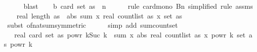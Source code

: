 \begin{isabellebody}
\ \ \ \ \isamarkupfalse%
\ blast\isanewline
\isanewline
\ \ \isamarkupfalse%
\ b{}{\isacharcolon}{\kern0pt}\ {\isachardoublequoteopen}card\ {\isacharparenleft}{\kern0pt}set\ as{\isacharparenright}{\kern0pt}\ {\isasymle}\ n{\isachardoublequoteclose}\isanewline
\ \ \ \ \isamarkupfalse%
\ {\isacharparenleft}{\kern0pt}rule\ card{\isacharunderscore}{\kern0pt}mono{\isacharbrackleft}{\kern0pt}\ B{\isacharequal}{\kern0pt}{\isachardoublequoteopen}{\isacharbraceleft}{\kern0pt}{}{\isachardot}{\kern0pt}{\isachardot}{\kern0pt}{\isacharless}{\kern0pt}n{\isacharbraceright}{\kern0pt}{\isachardoublequoteclose}{\isacharcomma}{\kern0pt}\ simplified{\isacharbrackright}{\kern0pt}{\isacharcomma}{\kern0pt}\ rule\ assms{\isacharparenleft}{\kern0pt}{}{\isacharparenright}{\kern0pt}{\isacharparenright}{\kern0pt}\isanewline
\isanewline
\ \ \isamarkupfalse%
\ {\isachardoublequoteopen}real\ {\isacharparenleft}{\kern0pt}length\ as{\isacharparenright}{\kern0pt}\ {\isacharequal}{\kern0pt}\ abs\ {\isacharparenleft}{\kern0pt}sum\ {\isacharparenleft}{\kern0pt}{\isasymlambda}x{\isachardot}{\kern0pt}\ real\ {\isacharparenleft}{\kern0pt}count{\isacharunderscore}{\kern0pt}list\ as\ x{\isacharparenright}{\kern0pt}{\isacharparenright}{\kern0pt}\ {\isacharparenleft}{\kern0pt}set\ as{\isacharparenright}{\kern0pt}{\isacharparenright}{\kern0pt}{\isachardoublequoteclose}\isanewline
\ \ \ \ \isamarkupfalse%
\ {\isacharparenleft}{\kern0pt}subst\ of{\isacharunderscore}{\kern0pt}nat{\isacharunderscore}{\kern0pt}sum{\isacharbrackleft}{\kern0pt}symmetric{\isacharbrackright}{\kern0pt}{\isacharparenright}{\kern0pt}\isanewline
\ \ \ \ \isamarkupfalse%
\ {\isacharparenleft}{\kern0pt}simp\ add{\isacharcolon}{\kern0pt}\ sum{\isacharunderscore}{\kern0pt}count{\isacharunderscore}{\kern0pt}set{\isacharparenright}{\kern0pt}\isanewline
\ \ \isamarkupfalse%
\ \isamarkupfalse%
\ {\isachardoublequoteopen}{\isachardot}{\kern0pt}{\isachardot}{\kern0pt}{\isachardot}{\kern0pt}\ {\isasymle}\ {\isacharparenleft}{\kern0pt}real\ {\isacharparenleft}{\kern0pt}card\ {\isacharparenleft}{\kern0pt}set\ as{\isacharparenright}{\kern0pt}{\isacharparenright}{\kern0pt}{\isacharparenright}{\kern0pt}\ powr\ {\isacharparenleft}{\kern0pt}{\isacharparenleft}{\kern0pt}k{\isacharminus}{\kern0pt}Suc\ {}{\isacharparenright}{\kern0pt}{\isacharslash}{\kern0pt}k{\isacharparenright}{\kern0pt}\ {\isacharasterisk}{\kern0pt}\ {\isacharparenleft}{\kern0pt}sum\ {\isacharparenleft}{\kern0pt}{\isasymlambda}x{\isachardot}{\kern0pt}\ abs\ {\isacharparenleft}{\kern0pt}real\ {\isacharparenleft}{\kern0pt}count{\isacharunderscore}{\kern0pt}list\ as\ x{\isacharparenright}{\kern0pt}{\isacharparenright}{\kern0pt}\ powr\ k{\isacharparenright}{\kern0pt}\ {\isacharparenleft}{\kern0pt}set\ as{\isacharparenright}{\kern0pt}{\isacharparenright}{\kern0pt}\ powr\ {\isacharparenleft}{\kern0pt}{}{\isacharslash}{\kern0pt}k{\isacharparenright}{\kern0pt}{\isachardoublequoteclose}\isanewline

\end{isabellebody}
